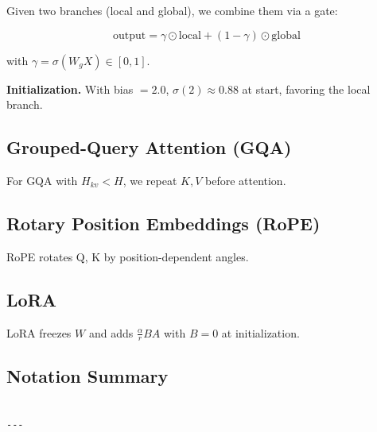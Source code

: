 Given two branches (local and global), we combine them via a gate:

\[
\text{output} = \gamma \odot \text{local} + (1 - \gamma) \odot \text{global}
\]

with $\gamma = \sigma(W_g X) \in [0, 1]$.

\textbf{Initialization.} With bias $= 2.0$, $\sigma(2) \approx 0.88$ at start, 
favoring the local branch.

\subsection{Grouped-Query Attention (GQA)}

For GQA with $H_{kv} < H$, we repeat $K, V$ before attention.

\subsection{Rotary Position Embeddings (RoPE)}

RoPE rotates Q, K by position-dependent angles.

\subsection{LoRA}

LoRA freezes $W$ and adds $\frac{\alpha}{r} B A$ with $B = 0$ at 
initialization.

\subsection{Notation Summary}

\begin{lstlisting}

---
\end{lstlisting}